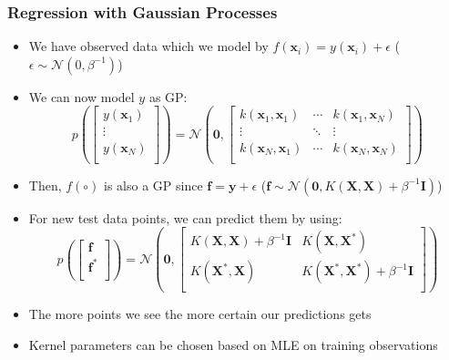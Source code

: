 \subsubsection{Regression with Gaussian Processes}
\begin{itemize}
	\item We have observed data which we model by $f(\bm{x}_i) = y(\bm{x}_i) + \epsilon$ ($\epsilon\sim\mathcal{N}(0,\beta^{-1})$)
	\item We can now model $y$ as GP: 
	$$p\left(\begin{bmatrix}
	y(\bm{x}_1)\\
	\vdots\\
	y(\bm{x}_N)\\
	\end{bmatrix}\right) = \mathcal{N}\left(\bm{0}, \begin{bmatrix}
	k(\bm{x}_1, \bm{x}_1) & \cdots & k(\bm{x}_1, \bm{x}_N)\\
	\vdots & \ddots & \vdots\\
	k(\bm{x}_N, \bm{x}_1)& \cdots & k(\bm{x}_N, \bm{x}_N)\\
	\end{bmatrix}\right)$$
	\item Then, $f(\circ)$ is also a GP since $\bm{f} = \bm{y} + \epsilon$ ($\bm{f}\sim \mathcal{N}(\bm{0}, K(\bm{X}, \bm{X}) + \beta^{-1}\bm{I})$)
	\item For new test data points, we can predict them by using:
	$$p\left(\begin{bmatrix}
	\bm{f}\\
	\bm{f}^{*}\\
	\end{bmatrix}\right) = \mathcal{N}\left(\bm{0}, \begin{bmatrix}
	K(\bm{X}, \bm{X}) + \beta^{-1}\bm{I} & K(\bm{X},\bm{X}^{*})\\
	K(\bm{X}^{*},\bm{X}) & K(\bm{X}^{*}, \bm{X}^{*}) + \beta^{-1}\bm{I}\\
	\end{bmatrix}\right)$$
	\item The more points we see the more certain our predictions gets
	\item Kernel parameters can be chosen based on MLE on training observations
\end{itemize}